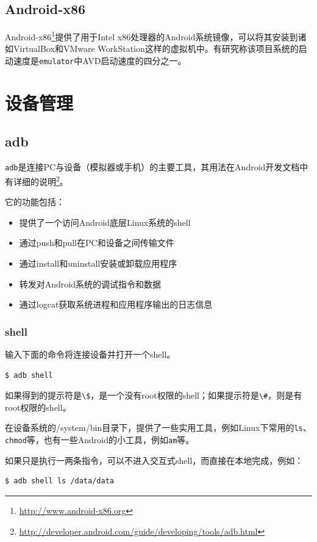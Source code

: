 \subsection{Android-x86}
Android-x86\footnote{\url{http://www.android-x86.org}}提供了用于Intel x86处理器的Android系统镜像，可以将其安装到诸如VirtualBox和VMware WorkStation这样的虚拟机中。有研究称该项目系统的启动速度是\lstinline!emulator!中AVD启动速度的四分之一。

\section{设备管理}
\subsection{adb}
\lstinline!adb!是连接PC与设备（模拟器或手机）的主要工具，其用法在Android开发文档中有详细的说明\footnote{\url{http://developer.android.com/guide/developing/tools/adb.html}}。

它的功能包括：
\begin{itemize}
\item 提供了一个访问Android底层Linux系统的shell
\item 通过push和pull在PC和设备之间传输文件
\item 通过install和uninstall安装或卸载应用程序
\item 转发对Android系统的调试指令和数据
\item 通过logcat获取系统进程和应用程序输出的日志信息
\end{itemize}

\subsubsection{shell}
输入下面的命令将连接设备并打开一个shell。
\begin{lstlisting}[numbers=none]
 $ adb shell
\end{lstlisting}
如果得到的提示符是\lstinline!\$!，是一个没有root权限的shell；如果提示符是\lstinline!\#!，则是有root权限的shell。

在设备系统的/system/bin目录下，提供了一些实用工具，例如Linux下常用的\lstinline!ls!、\lstinline!chmod!等，也有一些Android的小工具，例如\lstinline!am!等。

如果只是执行一两条指令，可以不进入交互式shell，而直接在本地完成，例如：
\begin{lstlisting}[numbers=none]
 $ adb shell ls /data/data
\end{lstlisting}


